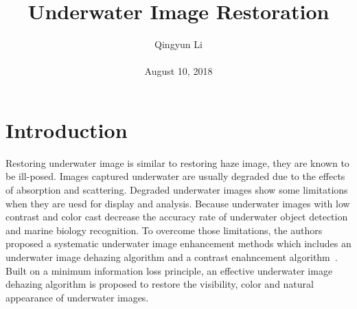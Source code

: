 \documentclass[10pt,twocolumn,letterpaper]{article}
\begin{document}
	
	\author{Qingyun Li\\\\
		August 10, 2018}        
	\title{Underwater Image Restoration}
	
	\maketitle
	
	\section{Introduction}
	\par Restoring underwater image is similar to restoring haze image, they are known to be ill-posed. Images captured underwater are usually degraded due to the effects of absorption and scattering. Degraded underwater images show some limitations when they are uesd for display and analysis. Because underwater images with low contrast and color cast decrease the accuracy rate of underwater object detection and marine biology recognition. To overcome those limitations, the authors proposed a systematic underwater image enhancement methods which includes an underwater image dehazing algorithm and a contrast enahncement algorithm~\cite{Li2016Underwater}. Built on a minimum information loss principle, an effective underwater image dehazing algorithm is proposed to restore the visibility, color and natural appearance of underwater images. 
\end{document}
